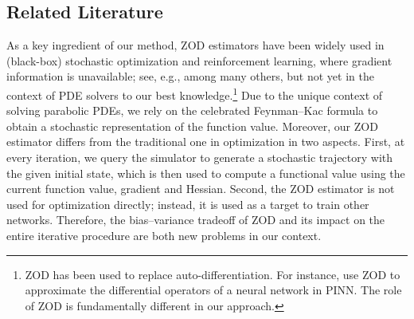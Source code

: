 \documentclass[twoside,11pt]{article}
\newcommand{\1}{\mathbf{1}}
\numberwithin{equation}{section}
\begin{document}
\subsection*{Related Literature}
As a key ingredient of our method, ZOD estimators have been widely used in (black-box) stochastic optimization and reinforcement learning, where gradient information is unavailable; see, e.g., \citet{nesterov2017Random,salimans2017evolution} among many others, but not yet in the context of PDE solvers to our best knowledge.\footnote{ZOD has been used to replace auto-differentiation. For instance, \citet{he2023learning,shi2024stochastic,hu2025bias} use ZOD to approximate the differential operators of a neural network in PINN. The role of ZOD is fundamentally different in our approach.}
Due to the unique context of solving parabolic PDEs, we rely on the celebrated Feynman--Kac formula to obtain a stochastic representation of the function value. Moreover, our ZOD estimator differs from the traditional one in optimization in two aspects. First, at every iteration, we query the simulator to generate a stochastic trajectory with the given initial state, which is then used to compute a functional value using the current function value, gradient and Hessian. Second, the ZOD estimator is not used for optimization directly; instead, it is used as a target to train other networks. Therefore, the bias--variance tradeoff of ZOD and its impact on the entire iterative procedure are both new problems in our context.
\end{document}
